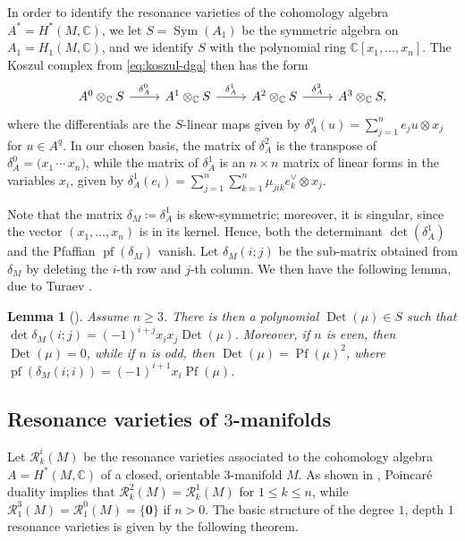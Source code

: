 \documentclass{article}
\numberwithin{equation}{section}
\newtheorem{lemma}[theorem]{Lemma}
\theoremstyle{definition}
\renewcommand{\C}{\mathbb{C}}
\newcommand{\RR}{\mathcal{R}}
\DeclareMathOperator{\Sym}{Sym}
\DeclareMathOperator{\Pf}{Pf}
\DeclareMathOperator{\pf}{pf}
\DeclareMathOperator{\Det}{Det}
\newcommand{\zero}{\mathbf{0}}
\begin{document}
In order to identify the resonance varieties of the cohomology algebra $A^*=H^*(M,\C)$, 
we let $S=\Sym(A_1)$ be the symmetric algebra on $A_1=H_1(M,\C)$, 
and we identify $S$ with the polynomial ring $\C[x_1,\dots,x_n]$. 
The Koszul complex from \eqref{eq:koszul-dga} then has the form 
\begin{equation}
\label{eq:koszul 3mfd}
\begin{tikzcd}[column sep=24pt]
A^0\otimes_\C S \ar[r, "\delta^{0}_A"] 
& A^1\otimes_\C S \ar[r, "\delta^{1}_A"] 
&A^2\otimes_\C  S \ar[r, "\delta^{2}_A"] 
&A^3\otimes_\C  S,
\end{tikzcd}
\end{equation}
where the differentials are the $S$-linear maps given by 
$\delta^q_A(u)=\sum_{j=1}^{n} e_j u \otimes x_j$ for $u\in A^q$.  
In our chosen basis, the matrix of  $\delta^2_A$ is the transpose 
of $\delta^0_A=\big(x_1 \, \cdots\, x_n\big)$, while the matrix 
of $\delta^1_A$ is an $n\times n$ matrix of linear forms in 
the variables $x_i$, given by $\delta^1_A(e_i)=
\sum_{j=1}^{n} \sum_{k=1}^{n}\mu_{jik} e_k^{\vee} \otimes x_j$. 

Note that the matrix $\delta_M\coloneqq \delta^1_A$ is skew-symmetric; 
moreover, it is singular, since the vector $(x_1,\dots, x_n)$ is in its kernel.   
Hence, both the determinant $\det(\delta^1_A)$ and the Pfaffian 
$\pf(\delta_M)$ vanish. 
Let $\delta_M(i;j)$ be the sub-matrix obtained from $\delta_M$ 
by deleting the $i$-th row and $j$-th column. We then have the following 
lemma, due to Turaev \cite{Tu}. 

\begin{lemma}[\cite{Tu}]
\label{lem:turaev}
Assume $n\ge 3$. There is then a polynomial 
$\Det(\mu)\in S$ such that $\det \delta_M(i;j) = (-1)^{i+j}x_ix_j \Det(\mu)$.  
Moreover, if $n$ is even, then $\Det(\mu)=0$, while if $n$ is odd, 
then $\Det(\mu)=\Pf(\mu)^2$, where $\pf (\delta_M(i;i)) = (-1)^{i+1} x_i \Pf(\mu)$. 
\end{lemma}

\subsection{Resonance varieties of $3$-manifolds}
\label{subsec:res 3-mfd} 
Let $\RR^i_k(M)$ be the resonance varieties 
associated to the cohomology algebra $A=H^*(M,\C)$ of a closed, 
orientable $3$-manifold $M$.  
As shown in \cite{Su-edinb}, Poincar\'e duality implies that 
$\RR^{2}_k(M)=\RR^1_k(M)$ for $1\le k \le n$, while  
$\RR^{3}_1(M)=\RR^0_1(M)=\{\zero\}$ if $n>0$.  
The basic structure of the degree $1$, depth $1$ resonance 
varieties is given by the following theorem.
\end{document}
